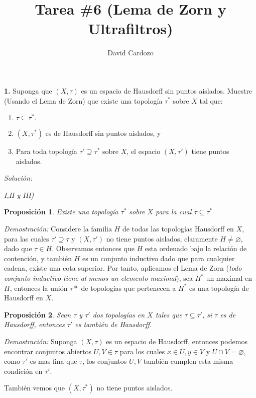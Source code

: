 \documentclass[11pt,a4paper,draft]{article}
\author{David Cardozo}
\title{Tarea \#6 (Lema de Zorn y Ultrafiltros)}
\newtheorem{prop}{Proposición}
\begin{document}
	\maketitle
	\textbf{1.} Suponga que $ (X, \tau) $ es un espacio de Hausdorff sin puntos aislados. Muestre (Usando el Lema de Zorn) que existe una topología $ \tau^* $ sobre $ X $ tal que:
	\begin{enumerate}[label = \roman*]
		\item $ \tau \subseteq \tau^* .$
		\item $ (X,\tau^*) $ es de Hausdorff sin puntos aislados, y
		\item Para toda topología $ \tau' \supsetneq \tau^* $ sobre $ X $, el espacio $ (X, \tau') $ tiene puntos aislados. 
	\end{enumerate}
\textit{Solución:}

\textit{I,II y III)} 

\begin{prop}
	Existe una topología $ \tau^* $ sobre $X$ para la cual $ \tau \subseteq \tau^* $
\end{prop}

\textit{Demostración:} Considere la familia $ H $ de todas las topologías Hausdorff en $ X $, para las cuales $ \tau'  \supseteq \tau $ y $ (X,\tau') $ no tiene puntos aislados, claramente $ H \neq \varnothing $, dado que $ \tau \in H $. Observamos entonces que $ H $ esta ordenado bajo la relación de contención, y también $ H $ es un conjunto inductivo dado que para cualquier cadena, existe una cota superior. Por tanto, aplicamos el Lema de Zorn (\emph{todo conjunto inductivo tiene al menos un elemento maximal}), sea $ H^* $ un maximal en $ H $, entonces la unión $ \tau* $ de topologías que pertenecen a $ H^* $ es una topología de Hausdorff en $ X $.

\begin{prop}
	 Sean $ \tau $ y $ \tau' $ dos topologías en $ X $ tales que $ \tau \subseteq \tau' $, si $ \tau $ es de Hausdorff, entonces $ \tau' $ es también de Hausdorff.
\end{prop}

\textit{Demostración:} Suponga $ (X,\tau) $ es un espacio de Hausdorff, entonces podemos encontrar conjuntos abiertos $ U,V \in \tau $ para los cuales $ x \in U, y\in V \textrm{ y } U \cap V = \varnothing $, como $ \tau' $ es mas fina que $ \tau $, los conjuntos $ U,V $ también cumplen esta misma condición en $ \tau' $.

También vemos que $ (X, \tau^*) $ no tiene puntos aislados.
\end{document}
